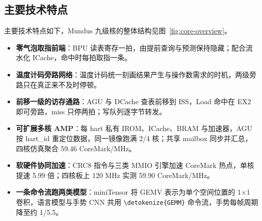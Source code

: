 \documentclass[UTF8,a4paper,12pt,fontset=none,scheme=plain]{ctexart}
\newcommand{\code}[1]{\texttt{\detokenize{#1}}}
\renewcommand{\code}[1]{{\small\ttfamily\urlstyle{tt}\expandafter\nolinkurl\expandafter{\detokenize{#1}}}}
\begin{document}
\subsection{主要技术特点}
主要技术特点如下，Mundus 九级核的整体结构见图~\ref{fig:core-overview}。
\begin{itemize}
\item \textbf{零气泡取指前端}：BPU 读表寄存一拍，由提前查询与预测保持隐藏；配合流水化 ICache，命中时每拍取指一条。
\item \textbf{温度计码旁路网络}：温度计码统一刻画结果产生与操作数需求的时机，两级旁路只在真正来不及时停顿。
\item \textbf{前移一级的访存通路}：AGU 与 DCache 查表前移到 ISS，Load 命中在 EX2 即可旁路，miss 只停两拍；写队列逐字节转发。
\item \textbf{可扩展多核 AMP}：每 hart 私有 IROM、ICache、BRAM 与加速器，AGU 按 hart\_id 重定位数据，同一镜像跑满 2/4 核；共享 mailbox 同步并汇总，四核仿真聚合 59.46 CoreMark/MHz。
\item \textbf{软硬件协同加速}：CRC8 指令与三类 MMIO 引擎加速 CoreMark 热点，单核提速 5.99 倍；四核板上 120 MHz 实测 59.90 CoreMark/MHz。
\item \textbf{一条命令流跑两类模型}：miniTensor 将 GEMV 表示为单个空间位置的 1×1 卷积，语言模型与手势 CNN 共用 \code{GEMM} 命令流，手势每帧周期降至约 1/5.5。
\end{itemize}
\end{document}
